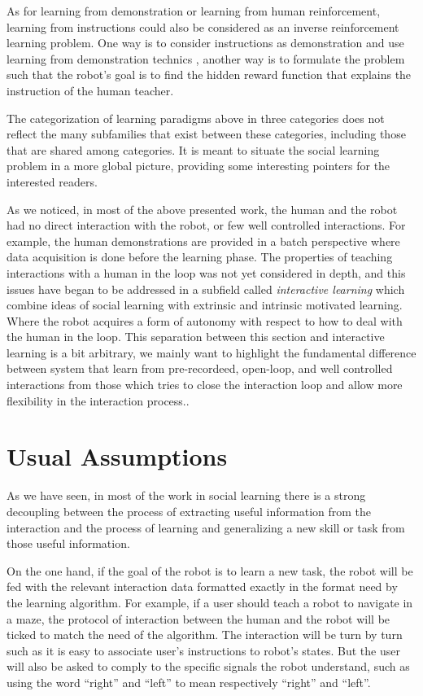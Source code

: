 As for learning from demonstration or learning from human reinforcement, learning from instructions could also be considered as an inverse reinforcement learning problem. One way is to consider instructions as demonstration and use learning from demonstration technics , another way is to formulate the problem such that the robot's goal is to find the hidden reward function that explains the instruction of the human teacher.

\transition

The categorization of learning paradigms above in three categories does not reflect the many subfamilies that exist between these categories, including those that are shared among categories. It is meant to situate the social learning problem in a more global picture, providing some interesting pointers for the interested readers. 

As we noticed, in most of the above presented work, the human and the robot had no direct interaction with the robot, or few well controlled interactions. For example, the human demonstrations are provided in a batch perspective where data acquisition is done
before the learning phase. The properties of teaching interactions with a human in the loop was not yet considered in depth, and this issues have began to be addressed in a subfield called \emph{interactive learning}  which combine ideas of social learning with extrinsic and intrinsic motivated learning. Where the robot acquires a form of autonomy with respect to how to deal with the human in the loop. This separation between this section and interactive learning is a bit arbitrary, we mainly want to highlight the fundamental difference between system that learn from pre-recordeed, open-loop, and  well controlled interactions from those which tries to close the interaction loop and allow more flexibility in the interaction process..

\section{Usual Assumptions}

As we have seen, in most of the work in social learning there is a strong decoupling between the process of extracting useful information from the interaction and the process of learning and generalizing a new skill or task from those useful information.

On the one hand, if the goal of the robot is to learn a new task, the robot will be fed with the relevant interaction data formatted exactly in the format need by the learning algorithm. For example, if a user should teach a robot to navigate in a maze, the protocol of interaction between the human and the robot will be ticked to match the need of the algorithm. The interaction will be turn by turn such as it is easy to associate user's instructions to robot's states. But the user will also be asked to comply to the specific signals the robot understand, such as using the word ``right'' and ``left'' to mean respectively ``right'' and ``left''.

